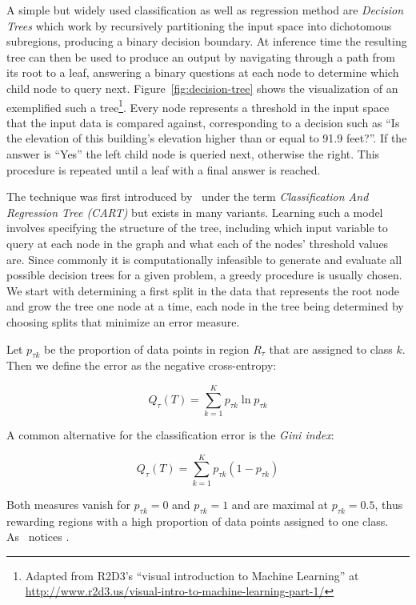 A simple but widely used classification as well as regression method are \emph{Decision Trees} which work by recursively partitioning the input space into dichotomous subregions, producing a binary decision boundary. At inference time the resulting tree can then be used to produce an output by navigating through a path from its root to a leaf, answering a binary questions at each node to determine which child node to query next. Figure~\ref{fig:decision-tree} shows the visualization of an exemplified such a tree\footnote{Adapted from R2D3's ``visual introduction to Machine Learning'' at \url{http://www.r2d3.us/visual-intro-to-machine-learning-part-1/}}.
Every node represents a threshold in the input space that  the input data is compared against, corresponding to a decision such as ``Is the elevation of this building's elevation higher than or equal to 91.9 feet?''. If the answer is ``Yes'' the left child node is queried next, otherwise the right. This procedure is repeated until a leaf with a final answer is reached.

The technique was first introduced by~\cite{Breiman:1984ab} under the term \emph{Classification And Regression Tree (CART)} but exists in many variants. Learning such a model involves specifying the structure of the tree, including which input variable to query at each node in the graph and what each of the nodes' threshold values are. Since commonly it is computationally infeasible to generate and evaluate all possible decision trees for a given problem, a greedy procedure is usually chosen. We start with determining a first split in the data that represents the root node and grow the tree one node at a time, each node in the tree being determined by choosing splits that minimize an error measure.

Let $p_{\tau k}$ be the proportion of data points in region $R_{\tau}$ that are assigned to class $k$. Then we define the error as the negative cross-entropy:

\begin{equation}
  Q_{\tau}(T) = \sum_{k=1}^K p_{\tau k} \ln p_{\tau k}
\end{equation}

A common alternative for the classification error is the \emph{Gini index}:

\begin{equation}
  Q_{\tau}(T) = \sum_{k=1}^K p_{\tau k} (1 - p_{\tau k})
\end{equation}

Both measures vanish for $p_{\tau k} = 0$ and $p_{\tau k} = 1$ and are maximal at $p_{\tau k} = 0.5$, thus rewarding regions with a high proportion of data points assigned to one class. As~\cite[Chapter 14.4, p.~664]{Bishop:2006aa} notices .

